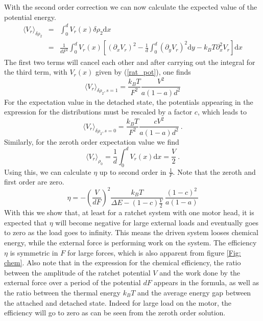 \documentclass[aps,pre,onecolumn,showpacs,showkeys,a4paper]{revtex4}
\newcommand{\rmd}{{\mathrm d}}
\begin{document}
With the second order correction we can now calculate the expected value of the potential energy.
\begin{eqnarray}
\langle V_r \rangle_{\delta\rho_2} &=& \int_0^d V_r(x)\delta\rho_2 \rmd x\nonumber\\
&=& \frac{1}{dF^2}\int_0^d V_r(x) \left[\left(\partial_xV_r\right)^2 - \frac{1}{d}\int_0^d\left(\partial_yV_r\right)^2 \rmd y  - k_B T \partial_x^2V_r\right]\rmd x
\end{eqnarray}
The first two terms will cancel each other and after carrying out the integral for the third term, with $V_r(x)$ given by (\ref{rat_pot}), one finds 
\begin{equation}
\langle V_r \rangle_{\delta\rho_2, s=1} = \frac{k_B T}{F^2}\frac{V^2}{a\left(1-a\right)d^2}
\end{equation}
For the expectation value in the detached state, the potentials appearing in the expression for the distributions must be rescaled by a factor $c$, which leads to
\begin{equation}
\langle V_r \rangle_{\delta\rho_2, s=0} = \frac{k_B T}{F^2}\frac{cV^2}{a\left(1-a\right)d^2}\ .
\end{equation}
Similarly, for the zeroth order expectation value we find
\begin{equation}
\langle V_r \rangle_{\rho_0} = \frac{1}{d}\int_0^d V_r(x)\rmd x = \frac{V}{2}\ .
\end{equation}
Using this, we can calculate $\eta$ up to second order in $\frac{1}{F}$. 
Note that the zeroth and first order are zero.
\begin{equation}
\eta = -\left(\frac{V}{dF}\right)^2\frac{k_BT}{\Delta E - (1-c)\frac{V}{2}}\ \frac{\left(1-c\right)^2}{a(1-a)}
\end{equation}
With this we show that, at least for a ratchet system with one motor head, it is expected that $\eta$ will become negative for large external loads and eventually goes to zero as the load goes to infinity. 
This means the driven system looses chemical energy, while the external force is performing work on the system. 
The efficiency $\eta$ is symmetric in $F$ for large forces, which is also apparent from figure \ref{Fig: chem}. 
Also note that in the expression for the chemical efficiency, the ratio between the amplitude of the ratchet potential $V$ and the work done by the external force over a period of the potential $dF$ appears in the formula, as well as the ratio between the thermal energy $k_BT$ and the average energy gap between the attached and detached state. 
Indeed for large load on the motor, the efficiency will go to zero as can be seen from the zeroth order solution.
\end{document}
